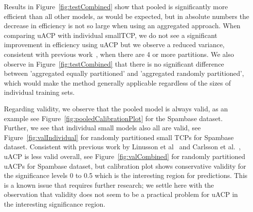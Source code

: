\documentclass[main]{subfiles}
\begin{document}
Results in Figure~\ref{fig:testCombined} show that pooled is significantly more efficient than all other models, as would be expected, but in absolute numbers the decrease in efficiency is not so large when using an aggregated approach. When comparing uACP with individual smallTCP, we do not see a significant improvement in efficiency using uACP but we observe a reduced variance, consistent with previous work~\cite{Carlsson:2014qr}, when there are 4 or more partitions. We also observe in Figure~\ref{fig:testCombined} that there is no significant difference between 'aggregated equally partitioned' and 'aggregated randomly partitioned', which would make the method generally applicable regardless of the sizes of individual training sets.


Regarding validity, we observe that the pooled model is always valid, as an example see Figure~\ref{fig:pooledCalibrationPlot} for the Spambase dataset. Further, we see that individual small models also all are valid, see Figure~\ref{fig:valIndividual} for randomly partitioned small TCPs for Spambase dataset. Consistent with previous work by Linusson et al~\cite{Linusson:2017dn} and Carlsson et al.~\cite{Carlsson:2014qr}, uACP is less valid overall, see Figure~\ref{fig:valCombined} for randomly partitioned uACPs for Spambase dataset, but calibration plot shows conservative validity for the significance levels 0 to 0.5 which is the interesting region for predictions. This is a known issue that requires further research; we settle here with the observation that validity does not seem to be a practical problem for uACP in the interesting significance region.
\end{document}
